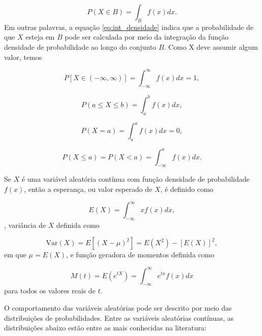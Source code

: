 \begin{equation} \label{eq:int_densidade}
    P(X \in B) = \displaystyle\int_{B} f(x) dx.
\end{equation} Em outras palavras, a equação \ref{eq:int_densidade} indica que a probabilidade de que $X$ esteja em $B$ pode ser calculada por meio da integração da função densidade de probabilidade ao longo do conjunto $B$. Como X deve assumir algum valor, temos

\begin{equation} \label{eq:int_densidade2}
    P[X \in (-\infty, \infty)] = \displaystyle\int_{-\infty}^{\infty} f(x) dx = 1,
\end{equation}

\begin{equation} \label{eq:int_densidade3}
    P(a \leq X \leq b ) = \displaystyle\int_{a}^{b} f(x) dx,
\end{equation}

\begin{equation} \label{eq:int_densidade4}
    P(X = a) = \displaystyle\int_{a}^{a} f(x) dx = 0,
\end{equation}

\begin{equation} \label{eq:int_densidade4}
    P(X \leq a) = P(X < a) =  \displaystyle\int_{-\infty}^{a} f(x) dx.
\end{equation}

Se $X$ é uma variável aleatória contínua com função densidade de probabilidade $f(x)$, então a esperança, ou valor esperado de $X$, é definido como 

\begin{equation}
    E(X) = \displaystyle\int_{-\infty}^{\infty} xf(x) dx,
\end{equation}, variância de $X$ definida como

\begin{equation}
    \mathrm{Var}(X) = E[(X - \mu)^2] = E(X^2) - [E(X)]^2, 
\end{equation} em que $\mu = E(X)$, e função geradora de momentos definida como

\begin{equation}
    M(t) = E(e^{tX}) = \displaystyle\int_{-\infty}^{\infty} e^{tx}f(x)dx
\end{equation} para todos os valores reais de $t$.

O comportamento das variáveis aleatórias pode ser descrito por meio das distribuições de probabilidades. Entre as variáveis aleatórias contínuas, as distribuições abaixo estão entre as mais conhecidas na literatura:

